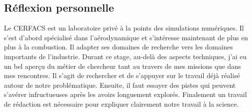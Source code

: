 \subsection*{Réflexion personnelle}

Le CERFACS est un laboratoire privé à la points des simulations numériques. Il s'est d'abord spécialisé dans l'aérodynamique et s’intéresse maintenant de plus en plus à la combustion. Il adapter ses domaines de recherche vers les domaines importants de l'industrie.
Durant ce stage, au-delà des aspects techniques, j'ai eu un bel aperçu du métier de chercheur tant au travers de mes missions que dans mes rencontres. Il s'agit de rechercher et de s'appuyer sur le travail déjà réalisé autour de notre problématique. Ensuite, il faut essayer des pistes qui peuvent s'avérer infructueuses après les avoirs longuement explorés. Finalement un travail de rédaction est nécessaire pour expliquer clairement notre travail à la science.
